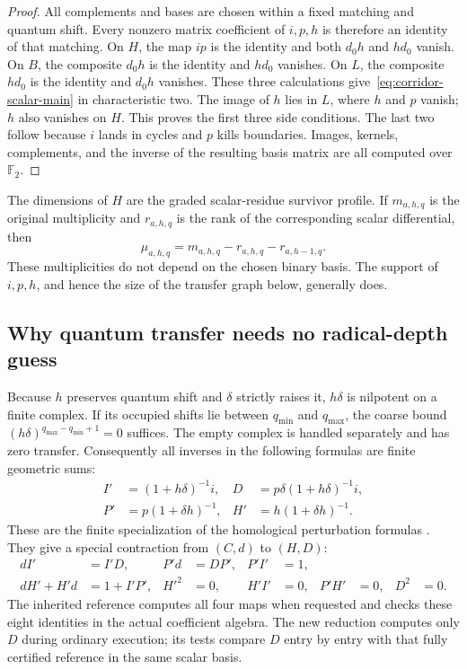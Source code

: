 \begin{proof}
All complements and bases are chosen within a fixed matching and quantum
shift.  Every nonzero matrix coefficient of $i,p,h$ is therefore an identity
of that matching.  On $H$, the map $ip$ is the identity and both $d_0h$ and
$hd_0$ vanish.  On $B$, the composite $d_0h$ is the identity and $hd_0$ vanishes.
On $L$, the composite $hd_0$ is the identity and $d_0h$ vanishes.  These three
calculations give~\eqref{eq:corridor-scalar-main} in characteristic two.
The image of $h$ lies in $L$, where $h$ and $p$ vanish; $h$ also vanishes on
$H$.  This proves the first three side conditions.  The last two follow
because $i$ lands in cycles and $p$ kills boundaries.  Images, kernels,
complements, and the inverse of the resulting basis matrix are all computed
over $\mathbb F_2$.
\end{proof}

The dimensions of $H$ are the graded scalar-residue survivor profile.  If
$m_{a,h,q}$ is the original multiplicity and $r_{a,h,q}$ is the rank of the
corresponding scalar differential, then
\begin{equation}\label{eq:corridor-profile}
 \mu_{a,h,q}=m_{a,h,q}-r_{a,h,q}-r_{a,h-1,q}.
\end{equation}
These multiplicities do not depend on the chosen binary basis.  The support
of $i,p,h$, and hence the size of the transfer graph below, generally does.

\subsection{Why quantum transfer needs no radical-depth guess}

Because $h$ preserves quantum shift and $\delta$ strictly raises it,
$h\delta$ is nilpotent on a finite complex.  If its occupied shifts lie
between $q_{\min}$ and $q_{\max}$, the coarse bound
$(h\delta)^{q_{\max}-q_{\min}+1}=0$ suffices.  The empty complex is handled
separately and has zero transfer.  Consequently all inverses in the following
formulas are finite geometric sums:
\begin{align}
 I'&=(1+h\delta)^{-1}i,&
 D&=p\delta(1+h\delta)^{-1}i,\label{eq:corridor-transfer}\\
 P'&=p(1+\delta h)^{-1},&
 H'&=h(1+\delta h)^{-1}.
 \label{eq:corridor-transfer-maps}
\end{align}
These are the finite specialization of the homological perturbation formulas \cite{Crainic2004}.
They give a special contraction from $(C,d)$ to $(H,D)$:
\begin{align}
 dI'&=I'D,&P'd&=DP',&P'I'&=1,\label{eq:corridor-cert-chain}\\
 dH'+H'd&=1+I'P',&H'^2&=0,&H'I'&=0,&P'H'&=0,&D^2&=0.
 \label{eq:corridor-cert-homotopy}
\end{align}
The inherited reference computes all four maps when requested and checks
these eight identities in the actual coefficient algebra.  The new reduction
computes only $D$ during ordinary execution; its tests compare $D$ entry by
entry with that fully certified reference in the same scalar basis.

